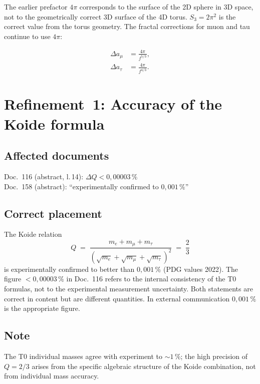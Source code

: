 The earlier prefactor $4\pi$ corresponds to the surface of the 2D sphere in 3D
space, not to the geometrically correct 3D surface of the 4D torus.
$S_3 = 2\pi^2$ is the correct value from the torus geometry. The fractal
corrections for muon and tau continue to use $4\pi$:

\begin{align}
  \Delta a_\mu  &= \frac{4\pi}{f^{5/3}}, \tag{190.5}\\
  \Delta a_\tau &= \frac{4\pi}{f^{4/3}}. \tag{190.6}
\end{align}

\section{Refinement~1: Accuracy of the Koide formula}

\subsection*{Affected documents}

Doc.~116 (abstract, l.\,14): $\Delta Q < 0{,}00003\,\%$ \\
Doc.~158 (abstract): ``experimentally confirmed to $0{,}001\,\%$''

\subsection*{Correct placement}

The Koide relation
\begin{equation}
  Q \;=\; \frac{m_e + m_\mu + m_\tau}
               {(\sqrt{m_e}+\sqrt{m_\mu}+\sqrt{m_\tau})^2}
  \;=\; \frac{2}{3}
  \tag{190.7}
\end{equation}
is experimentally confirmed to better than $0{,}001\,\%$ (PDG values 2022). The
figure $< 0{,}00003\,\%$ in Doc.~116 refers to the internal consistency of the
T0 formulas, not to the experimental measurement uncertainty. Both statements
are correct in content but are different quantities. In external communication
$0{,}001\,\%$ is the appropriate figure.

\subsection*{Note}

The T0 individual masses agree with experiment to $\sim 1\,\%$; the high
precision of $Q = 2/3$ arises from the specific algebraic structure of the
Koide combination, not from individual mass accuracy.

